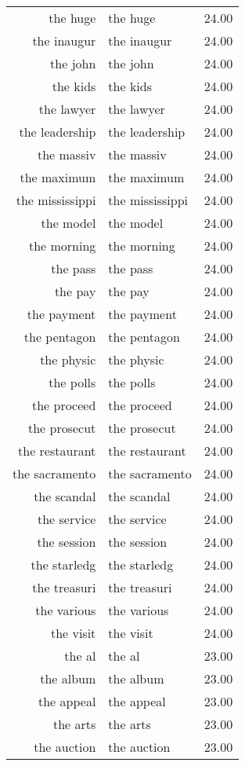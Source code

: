 \begin{table}[ht]
\begin{tabular}{rlr}
  the huge & the huge & 24.00 \\ 
  the inaugur & the inaugur & 24.00 \\ 
  the john & the john & 24.00 \\ 
  the kids & the kids & 24.00 \\ 
  the lawyer & the lawyer & 24.00 \\ 
  the leadership & the leadership & 24.00 \\ 
  the massiv & the massiv & 24.00 \\ 
  the maximum & the maximum & 24.00 \\ 
  the mississippi & the mississippi & 24.00 \\ 
  the model & the model & 24.00 \\ 
  the morning & the morning & 24.00 \\ 
  the pass & the pass & 24.00 \\ 
  the pay & the pay & 24.00 \\ 
  the payment & the payment & 24.00 \\ 
  the pentagon & the pentagon & 24.00 \\ 
  the physic & the physic & 24.00 \\ 
  the polls & the polls & 24.00 \\ 
  the proceed & the proceed & 24.00 \\ 
  the prosecut & the prosecut & 24.00 \\ 
  the restaurant & the restaurant & 24.00 \\ 
  the sacramento & the sacramento & 24.00 \\ 
  the scandal & the scandal & 24.00 \\ 
  the service & the service & 24.00 \\ 
  the session & the session & 24.00 \\ 
  the starledg & the starledg & 24.00 \\ 
  the treasuri & the treasuri & 24.00 \\ 
  the various & the various & 24.00 \\ 
  the visit & the visit & 24.00 \\ 
  the al & the al & 23.00 \\ 
  the album & the album & 23.00 \\ 
  the appeal & the appeal & 23.00 \\ 
  the arts & the arts & 23.00 \\ 
  the auction & the auction & 23.00 \\ 

\end{tabular}
\end{table}
